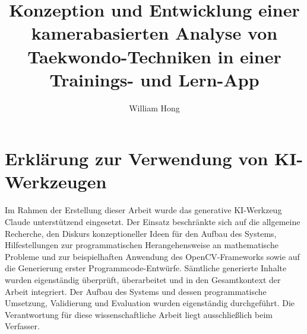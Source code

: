 \documentclass[intern]{cgMA}
\title{Konzeption und Entwicklung einer kamerabasierten Analyse von Taekwondo-Techniken in einer Trainings- und Lern-App}
\author{William Hong}
\begin{document}
\maketitle
\clearpage
\section*{Erklärung zur Verwendung von KI-Werkzeugen}
Im Rahmen der Erstellung dieser Arbeit wurde das generative KI-Werkzeug
Claude unterstützend eingesetzt. Der Einsatz beschränkte sich auf die allgemeine
Recherche, den Diskurs konzeptioneller Ideen für den Aufbau des Systems,
Hilfestellungen zur programmatischen Herangehensweise an mathematische Probleme
und zur beispielhaften Anwendung des OpenCV-Frameworks sowie auf die
Generierung erster Programmcode-Entwürfe. Sämtliche generierte Inhalte wurden
eigenständig überprüft, überarbeitet und in den Gesamtkontext der Arbeit integriert.
Der Aufbau des Systems und dessen programmatische Umsetzung, Validierung
und Evaluation wurden eigenständig durchgeführt. Die Verantwortung für
diese wissenschaftliche Arbeit liegt ausschließlich beim Verfasser.
\clearpage
\end{document}
